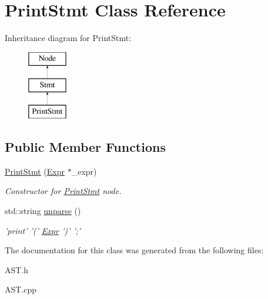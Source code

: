 \hypertarget{classPrintStmt}{\section{Print\-Stmt Class Reference}
\label{classPrintStmt}
}
Inheritance diagram for Print\-Stmt\-:\begin{figure}[H]
\begin{center}
\leavevmode
\includegraphics[height=3.000000cm]{classPrintStmt}
\end{center}
\end{figure}
\subsection*{Public Member Functions}
\begin{DoxyCompactItemize}
\item 
\hypertarget{classPrintStmt_a02701fedccfe3e4f509e628286e0ecf1}{\hyperlink{classPrintStmt_a02701fedccfe3e4f509e628286e0ecf1}{Print\-Stmt} (\hyperlink{classExpr}{Expr} $\ast$\-\_\-expr)}\label{classPrintStmt_a02701fedccfe3e4f509e628286e0ecf1}

\begin{DoxyCompactList}\small\item\em Constructor for \hyperlink{classPrintStmt}{Print\-Stmt} node. \end{DoxyCompactList}\item 
\hypertarget{classPrintStmt_aa3c9ad246b75bd45a48e563500b5109f}{std\-::string \hyperlink{classPrintStmt_aa3c9ad246b75bd45a48e563500b5109f}{unparse} ()}\label{classPrintStmt_aa3c9ad246b75bd45a48e563500b5109f}

\begin{DoxyCompactList}\small\item\em 'print' '(' \hyperlink{classExpr}{Expr} ')' ';' \end{DoxyCompactList}\end{DoxyCompactItemize}


The documentation for this class was generated from the following files\-:\begin{DoxyCompactItemize}
\item 
A\-S\-T.\-h\item 
A\-S\-T.\-cpp\end{DoxyCompactItemize}
